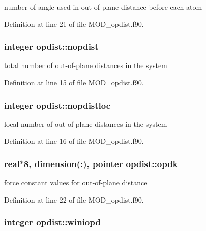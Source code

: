 number of angle used in out-\/of-\/plane distance before each atom 



Definition at line 21 of file M\-O\-D\-\_\-opdist.\-f90.

\hypertarget{classopdist_a4033a5b0a53e929560f7ad9f23b7ac88}{
\subsubsection[{nopdist}]{\setlength{\rightskip}{0pt plus 5cm}integer opdist\-::nopdist}}\label{classopdist_a4033a5b0a53e929560f7ad9f23b7ac88}


total number of out-\/of-\/plane distances in the system 



Definition at line 15 of file M\-O\-D\-\_\-opdist.\-f90.

\hypertarget{classopdist_a084f1a8d5999926a6dd842c0efb48a9c}{
\subsubsection[{nopdistloc}]{\setlength{\rightskip}{0pt plus 5cm}integer opdist\-::nopdistloc}}\label{classopdist_a084f1a8d5999926a6dd842c0efb48a9c}


local number of out-\/of-\/plane distances in the system 



Definition at line 16 of file M\-O\-D\-\_\-opdist.\-f90.

\hypertarget{classopdist_a47ec4098ffd8a4729c8667baf117b685}{
\subsubsection[{opdk}]{\setlength{\rightskip}{0pt plus 5cm}real$\ast$8, dimension(\-:), pointer opdist\-::opdk}}\label{classopdist_a47ec4098ffd8a4729c8667baf117b685}


force constant values for out-\/of-\/plane distance 



Definition at line 22 of file M\-O\-D\-\_\-opdist.\-f90.

\hypertarget{classopdist_a979e3c92d726c6792e0626f2472c31d7}{
\subsubsection[{winiopd}]{\setlength{\rightskip}{0pt plus 5cm}integer opdist\-::winiopd}}\label{classopdist_a979e3c92d726c6792e0626f2472c31d7}


